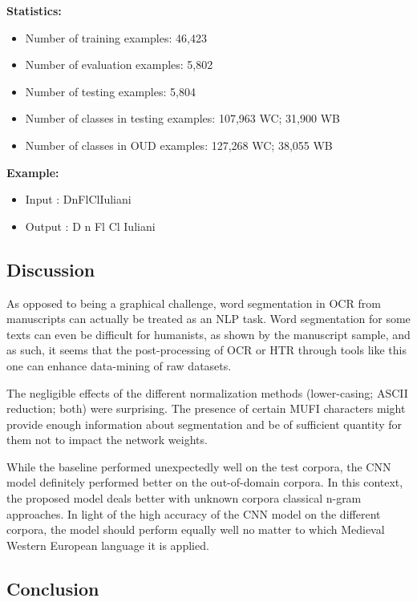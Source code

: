 \documentclass{jdmdh}
\begin{document}
\textbf{Statistics:}

\begin{itemize}
\item Number of training examples: 46,423
\item Number of evaluation examples: 5,802
\item Number of testing examples: 5,804
\item Number of classes in testing examples: 107,963 WC; 31,900 WB
\item Number of classes in OUD examples: 127,268 WC; 38,055 WB
\end{itemize}

\textbf{Example:}

\begin{itemize}
    \item Input : DnFlClIuliani	
    \item Output : D n Fl Cl Iuliani
\end{itemize}

\subsection{Discussion}

As opposed to being a graphical challenge, word segmentation in OCR from manuscripts can actually be treated as an NLP task. Word segmentation for some texts can even be difficult for humanists, as shown by the manuscript sample, and as such, it seems that the post-processing of OCR or HTR through tools like this one can enhance data-mining of raw datasets.

The negligible effects of the different normalization methods (lower-casing; ASCII reduction; both) were surprising. The presence of certain MUFI characters might provide enough information about segmentation and be of sufficient quantity for them not to impact the network weights. 

While the baseline performed unexpectedly well on the test corpora, the CNN model definitely performed better on the out-of-domain corpora. In this context, the proposed model deals better with unknown corpora classical n-gram approaches. In light of the high accuracy of the CNN model on the different corpora, the model should perform equally well no matter to which Medieval Western European language it is applied.

\subsection{Conclusion}
\end{document}
